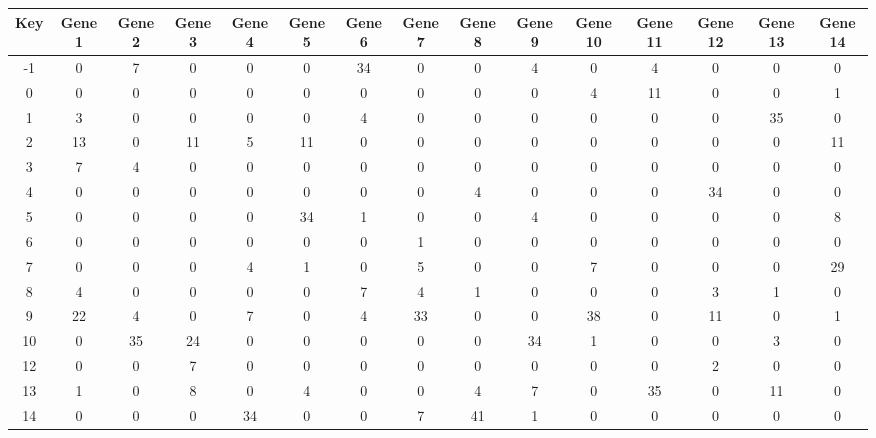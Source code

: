 \begin{tabular}{|c|c|c|c|c|c|c|c|c|c|c|c|c|c|c|}
\hline
Key & Gene 1 & Gene 2 & Gene 3 & Gene 4 & Gene 5 & Gene 6 & Gene 7 & Gene 8 & Gene 9 & Gene 10 & Gene 11 & Gene 12 & Gene 13 & Gene 14 \\
\hline
-1 & 0 & 7 & 0 & 0 & 0 & 34 & 0 & 0 & 4 & 0 & 4 & 0 & 0 & 0 \\
0 & 0 & 0 & 0 & 0 & 0 & 0 & 0 & 0 & 0 & 4 & 11 & 0 & 0 & 1 \\
1 & 3 & 0 & 0 & 0 & 0 & 4 & 0 & 0 & 0 & 0 & 0 & 0 & 35 & 0 \\
2 & 13 & 0 & 11 & 5 & 11 & 0 & 0 & 0 & 0 & 0 & 0 & 0 & 0 & 11 \\
3 & 7 & 4 & 0 & 0 & 0 & 0 & 0 & 0 & 0 & 0 & 0 & 0 & 0 & 0 \\
4 & 0 & 0 & 0 & 0 & 0 & 0 & 0 & 4 & 0 & 0 & 0 & 34 & 0 & 0 \\
5 & 0 & 0 & 0 & 0 & 34 & 1 & 0 & 0 & 4 & 0 & 0 & 0 & 0 & 8 \\
6 & 0 & 0 & 0 & 0 & 0 & 0 & 1 & 0 & 0 & 0 & 0 & 0 & 0 & 0 \\
7 & 0 & 0 & 0 & 4 & 1 & 0 & 5 & 0 & 0 & 7 & 0 & 0 & 0 & 29 \\
8 & 4 & 0 & 0 & 0 & 0 & 7 & 4 & 1 & 0 & 0 & 0 & 3 & 1 & 0 \\
9 & 22 & 4 & 0 & 7 & 0 & 4 & 33 & 0 & 0 & 38 & 0 & 11 & 0 & 1 \\
10 & 0 & 35 & 24 & 0 & 0 & 0 & 0 & 0 & 34 & 1 & 0 & 0 & 3 & 0 \\
12 & 0 & 0 & 7 & 0 & 0 & 0 & 0 & 0 & 0 & 0 & 0 & 2 & 0 & 0 \\
13 & 1 & 0 & 8 & 0 & 4 & 0 & 0 & 4 & 7 & 0 & 35 & 0 & 11 & 0 \\
14 & 0 & 0 & 0 & 34 & 0 & 0 & 7 & 41 & 1 & 0 & 0 & 0 & 0 & 0 \\
\hline
\end{tabular}